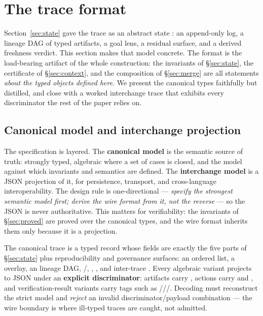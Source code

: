 \section{The trace format}\label{sec:format}

Section~\ref{sec:state} gave the trace as an abstract state \trace{}: an append-only log, a
lineage DAG of typed artifacts, a goal lens, a residual surface, and a derived freshness verdict.
This section makes that model concrete. The format is the load-bearing artifact of the whole
construction: the invariants of \S\ref{sec:state}, the certificate of \S\ref{sec:context}, and the
composition of \S\ref{sec:merge} are all statements \emph{about the typed objects defined here}. We
present the canonical types faithfully but distilled, and close with a worked interchange trace that
exhibits every discriminator the rest of the paper relies on.

\subsection{Canonical model and interchange projection}\label{sec:format-canonical}

The specification is layered. The \textbf{canonical model} is the semantic source of truth: strongly
typed, algebraic where a set of cases is closed, and the model against which invariants and semantics
are defined. The \textbf{interchange model} is a JSON projection of it, for persistence, transport,
and cross-language interoperability. The design rule is one-directional --- \emph{specify the
strongest semantic model first; derive the wire format from it, not the reverse} --- so the JSON is
never authoritative. This matters for verifiability: the invariants of \S\ref{sec:proved} are proved
over the canonical types, and the wire format inherits them only because it is a projection.

The canonical trace is a typed record whose fields are exactly the five parts of \S\ref{sec:state}
plus reproducibility and governance surfaces: an ordered  list, a 
overlay, an  lineage DAG, /,
, , and inter-trace . Every algebraic
variant projects to JSON under an \textbf{explicit discriminator}: artifacts carry
, actions carry  and , and verification-result variants
carry tags such as ///. Decoding must reconstruct
the strict model and \emph{reject} an invalid discriminator/payload combination --- the wire boundary
is where ill-typed traces are caught, not admitted.

